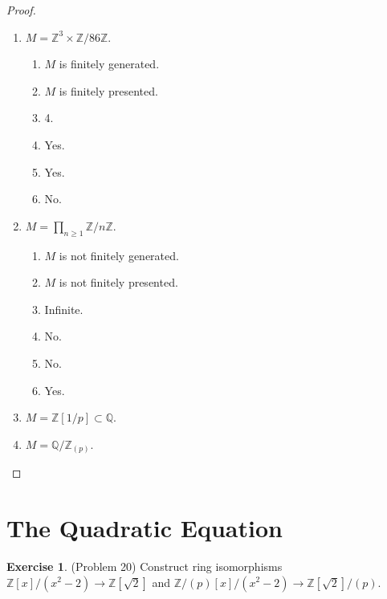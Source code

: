 \documentclass[12pt, psamsfonts]{amsart}
\theoremstyle{definition}
\newtheorem*{exer}{Exercise}
\theoremstyle{remark}
\numberwithin{equation}{section}
\begin{document}
\begin{proof}
$ $
  \begin{enumerate}[label=(\alph*)]
    \item 
      $M = \mathbb{Z}^3 \times \mathbb{Z} / 86\mathbb{Z}$.
      \begin{enumerate}[label=(\roman*)]
        \item 
          $M$ is finitely generated.
        \item
          $M$ is finitely presented.
        \item
          4.
        \item
          Yes.
        \item
          Yes.
        \item
          No.
      \end{enumerate}
    \item 
      $M = \prod_{n \geq 1} \mathbb{Z} / n\mathbb{Z}$.
      \begin{enumerate}[label=(\roman*)]
        \item 
          $M$ is not finitely generated.
        \item
          $M$ is not finitely presented.
        \item
          Infinite.
        \item
          No.
        \item
          No.
        \item
          Yes.
      \end{enumerate}
    \item 
      $M = \mathbb{Z}[1/p] \subset \mathbb{Q}$.
    \item 
      $M = \mathbb{Q} / \mathbb{Z}_{(p)}$.
  \end{enumerate}
\end{proof}

\section{The Quadratic Equation}

\begin{exer}{(Problem 20)}
  Construct ring isomorphisms $\mathbb{Z}[x]/(x^2 - 2) \rightarrow \mathbb{Z}[\sqrt{2}]$ and $\mathbb{Z}/(p)[x]/(x^2 - 2) \rightarrow \mathbb{Z}[\sqrt{2}]/(p)$.
\end{exer}
\end{document}

